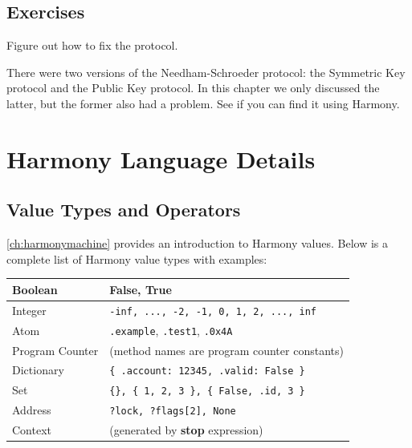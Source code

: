 \documentclass{report}
\begin{document}
\section*{Exercises}
\begin{problems}
\item Figure out how to fix the protocol.
\item There were two versions of the Needham-Schroeder protocol: the
Symmetric Key protocol and the Public Key protocol.  In this chapter
we only discussed the latter, but the former also had a problem.  See
if you can find it using Harmony.
\end{problems}




\appendix

\chapter{Harmony Language Details}

\section{Value Types and Operators}
\label{ap:values}

\autoref{ch:harmonymachine} provides an introduction to Harmony values.
Below is a complete list of Harmony value types with examples:

\vspace{1em}
\begin{tabular}{|l|l|}
\hline
Boolean & \textbf{False}, \textbf{True} \\
\hline
Integer & \texttt{-inf, ..., -2, -1, 0, 1, 2, ..., inf} \\
\hline
Atom & \texttt{.example}, \texttt{.test1}, \texttt{.0x4A} \\
\hline
Program Counter & (method names are program counter constants) \\
\hline
Dictionary & \texttt{\{ .account: 12345, .valid: False \} } \\
\hline
Set & \texttt{\{\}, \{ 1, 2, 3 \}, \{ False, .id, 3 \} } \\
\hline
Address & \texttt{?lock, ?flags[2], None} \\
\hline
Context & (generated by \textbf{stop} expression) \\
\hline
\end{tabular}
\vspace{1em}
\end{document}
